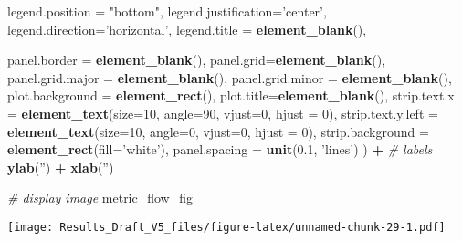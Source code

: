 \documentclass[
]{article}
\newenvironment{Shaded}{\begin{snugshade}}{\end{snugshade}}
\newcommand{\CommentTok}[1]{\textcolor[rgb]{0.56,0.35,0.01}{\textit{#1}}}
\newcommand{\DataTypeTok}[1]{\textcolor[rgb]{0.13,0.29,0.53}{#1}}
\newcommand{\DecValTok}[1]{\textcolor[rgb]{0.00,0.00,0.81}{#1}}
\newcommand{\FloatTok}[1]{\textcolor[rgb]{0.00,0.00,0.81}{#1}}
\newcommand{\KeywordTok}[1]{\textcolor[rgb]{0.13,0.29,0.53}{\textbf{#1}}}
\newcommand{\NormalTok}[1]{#1}
\newcommand{\OperatorTok}[1]{\textcolor[rgb]{0.81,0.36,0.00}{\textbf{#1}}}
\newcommand{\StringTok}[1]{\textcolor[rgb]{0.31,0.60,0.02}{#1}}
\begin{document}
\begin{Shaded}
\begin{Highlighting}[]
                        \DataTypeTok{legend.position =} \StringTok{"bottom"}\NormalTok{,}
                        \DataTypeTok{legend.justification=}\StringTok{'center'}\NormalTok{,}
                        \DataTypeTok{legend.direction=}\StringTok{'horizontal'}\NormalTok{,}
                        \DataTypeTok{legend.title =} \KeywordTok{element_blank}\NormalTok{(),}
                        
                        \DataTypeTok{panel.border =} \KeywordTok{element_blank}\NormalTok{(),}
                        \DataTypeTok{panel.grid=}\KeywordTok{element_blank}\NormalTok{(),}
                        \DataTypeTok{panel.grid.major =} \KeywordTok{element_blank}\NormalTok{(),}
                        \DataTypeTok{panel.grid.minor =} \KeywordTok{element_blank}\NormalTok{(),}
                        \DataTypeTok{plot.background =} \KeywordTok{element_rect}\NormalTok{(),}
                        \DataTypeTok{plot.title=}\KeywordTok{element_blank}\NormalTok{(),}
                        \DataTypeTok{strip.text.x =} \KeywordTok{element_text}\NormalTok{(}\DataTypeTok{size=}\DecValTok{10}\NormalTok{,}
                                          \DataTypeTok{angle=}\DecValTok{90}\NormalTok{, }\DataTypeTok{vjust=}\DecValTok{0}\NormalTok{, }\DataTypeTok{hjust =} \DecValTok{0}\NormalTok{),}
                        \DataTypeTok{strip.text.y.left =} \KeywordTok{element_text}\NormalTok{(}\DataTypeTok{size=}\DecValTok{10}\NormalTok{,}
                                          \DataTypeTok{angle=}\DecValTok{0}\NormalTok{, }\DataTypeTok{vjust=}\DecValTok{0}\NormalTok{, }\DataTypeTok{hjust =} \DecValTok{0}\NormalTok{),}
                        \DataTypeTok{strip.background =} \KeywordTok{element_rect}\NormalTok{(}\DataTypeTok{fill=}\StringTok{'white'}\NormalTok{),}
                        \DataTypeTok{panel.spacing =} \KeywordTok{unit}\NormalTok{(}\FloatTok{0.1}\NormalTok{, }\StringTok{'lines'}\NormalTok{)}
\NormalTok{                        ) }\OperatorTok{+}
\StringTok{                    }\CommentTok{# labels}
\StringTok{                      }\KeywordTok{ylab}\NormalTok{(}\StringTok{''}\NormalTok{) }\OperatorTok{+}\StringTok{ }\KeywordTok{xlab}\NormalTok{(}\StringTok{''}\NormalTok{)}



\CommentTok{# display image}
\NormalTok{  metric_flow_fig}
\end{Highlighting}
\end{Shaded}

\texttt{[image: Results\_Draft\_V5\_files/figure-latex/unnamed-chunk-29-1.pdf]}
\end{document}
